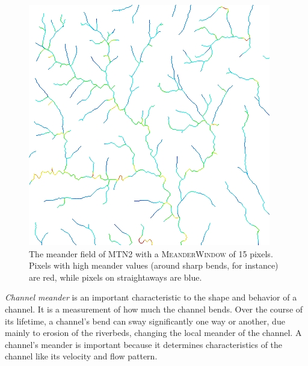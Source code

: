 \begin{figure}[t]
\centering
\begin{minipage}[b]{0.75\linewidth}
\begin{center}
\includegraphics[width=\linewidth]{images/MeanderField_Window15_WithoutWeights.jpg}
\end{center}
\end{minipage}
\caption[The meander field of MTN2 with a \textsc{MeanderWindow} of 15 pixels]{\label{figure:MeanderFieldVis}The meander field of MTN2 with a \textsc{MeanderWindow} of 15 pixels. Pixels with high meander values (around sharp bends, for instance) are red, while pixels on straightaways are blue.}
\end{figure}

\emph{Channel meander} is an important characteristic to the shape and behavior of a channel. It is a measurement of how much the channel bends. Over the course of its lifetime, a channel's bend can sway significantly one way or another, due mainly to erosion of the riverbeds, changing the local meander of the channel. 
A channel's meander is important because it determines 
characteristics of the channel like its velocity and flow pattern.

